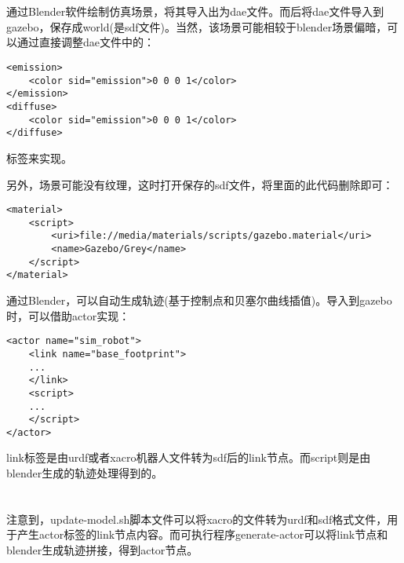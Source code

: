 \documentclass[12pt, twocolumn]{article}
\title{\normf{这是标题}}
\author{\normf{陈烁龙}}
\date{\normf{\today}}
\newcommand{\normf}{\kaishu}
\begin{document}
	
	\maketitle
	\thispagestyle{empty}
	\clearpage
	
	\tableofcontents
	\listoffigures
	\listoftables
	\setcounter{page}{1}
	\clearpage
	\setcounter{page}{1}
	
	
	\section{\normf{GAZEBO仿真}}
	\normf
	通过Blender软件绘制仿真场景，将其导入出为dae文件。而后将dae文件导入到gazebo，保存成world(是sdf文件)。当然，该场景可能相较于blender场景偏暗，可以通过直接调整dae文件中的：
\begin{lstlisting}[label=code2,caption={\normf 亮度调整}]
<emission>
	<color sid="emission">0 0 0 1</color>
</emission>
<diffuse>
	<color sid="emission">0 0 0 1</color>
</diffuse>
	\end{lstlisting}
	标签来实现。
	
	另外，场景可能没有纹理，这时打开保存的sdf文件，将里面的此代码删除即可：
\begin{lstlisting}[label=code2,caption={\normf 纹理缺失}]
<material>
	<script>
		<uri>file://media/materials/scripts/gazebo.material</uri>
		<name>Gazebo/Grey</name>
	</script>
</material>
\end{lstlisting}

	通过Blender，可以自动生成轨迹(基于控制点和贝塞尔曲线插值)。导入到gazebo时，可以借助actor实现：
\begin{lstlisting}[label=code2,caption={\normf 轨迹}]
<actor name="sim_robot">
    <link name="base_footprint">
    ...
    </link>
    <script>
    ...
    </script>
</actor>
\end{lstlisting}
link标签是由urdf或者xacro机器人文件转为sdf后的link节点。而script则是由blender生成的轨迹处理得到的。

\section{\normf{框架使用}}
注意到，update-model.sh脚本文件可以将xacro的文件转为urdf和sdf格式文件，用于产生actor标签的link节点内容。而可执行程序generate-actor可以将link节点和blender生成轨迹拼接，得到actor节点。
	
\end{document}
